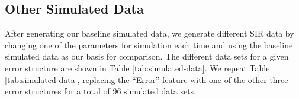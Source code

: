 \documentclass[12pt]{article}
\begin{document}
      \subsection{Other Simulated Data}

After generating our baseline simulated data, we generate different SIR data by changing one of the parameters for simulation each time and using the baseline simulated data as our basis for comparison. The different data sets for a given error structure are shown in Table \ref{tab:simulated-data}.  We repeat  Table \ref{tab:simulated-data}, replacing the ``Error'' feature with  one of the other three error structures for a total of 96 simulated data sets.


\end{document}
